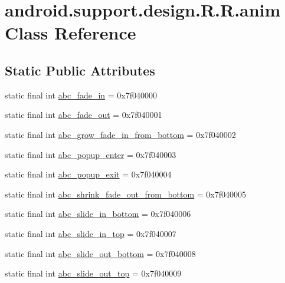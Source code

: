 \hypertarget{classandroid_1_1support_1_1design_1_1_r_1_1anim}{
\section{android.support.design.R.R.anim Class Reference}
\label{classandroid_1_1support_1_1design_1_1_r_1_1anim}
}
\subsection*{Static Public Attributes}
\begin{CompactItemize}
\item 
static final int \hyperlink{classandroid_1_1support_1_1design_1_1_r_1_1anim_216b006e30d9dbec439ac3abc9cfbf82}{abc\_\-fade\_\-in} = 0x7f040000
\item 
static final int \hyperlink{classandroid_1_1support_1_1design_1_1_r_1_1anim_a138bc0535bcb87536876e85572f07db}{abc\_\-fade\_\-out} = 0x7f040001
\item 
static final int \hyperlink{classandroid_1_1support_1_1design_1_1_r_1_1anim_389aa7137944983d1d91b16290cff12b}{abc\_\-grow\_\-fade\_\-in\_\-from\_\-bottom} = 0x7f040002
\item 
static final int \hyperlink{classandroid_1_1support_1_1design_1_1_r_1_1anim_32f014f6367a5fe09bcaaed1f17c82f5}{abc\_\-popup\_\-enter} = 0x7f040003
\item 
static final int \hyperlink{classandroid_1_1support_1_1design_1_1_r_1_1anim_1c9a8cef0e283df50be37f2a221c8e05}{abc\_\-popup\_\-exit} = 0x7f040004
\item 
static final int \hyperlink{classandroid_1_1support_1_1design_1_1_r_1_1anim_e711476350ad01267d67880c889a9417}{abc\_\-shrink\_\-fade\_\-out\_\-from\_\-bottom} = 0x7f040005
\item 
static final int \hyperlink{classandroid_1_1support_1_1design_1_1_r_1_1anim_524d9d16bbfcf83d9cc6bcd638248f85}{abc\_\-slide\_\-in\_\-bottom} = 0x7f040006
\item 
static final int \hyperlink{classandroid_1_1support_1_1design_1_1_r_1_1anim_5b1e98a9340d5aa1eefad669bc43eab0}{abc\_\-slide\_\-in\_\-top} = 0x7f040007
\item 
static final int \hyperlink{classandroid_1_1support_1_1design_1_1_r_1_1anim_c7f548e29aa338924fc9a3cc4434f85c}{abc\_\-slide\_\-out\_\-bottom} = 0x7f040008
\item 
static final int \hyperlink{classandroid_1_1support_1_1design_1_1_r_1_1anim_c771de9bcb23ca7683c17831812a522f}{abc\_\-slide\_\-out\_\-top} = 0x7f040009

\end{CompactItemize}
